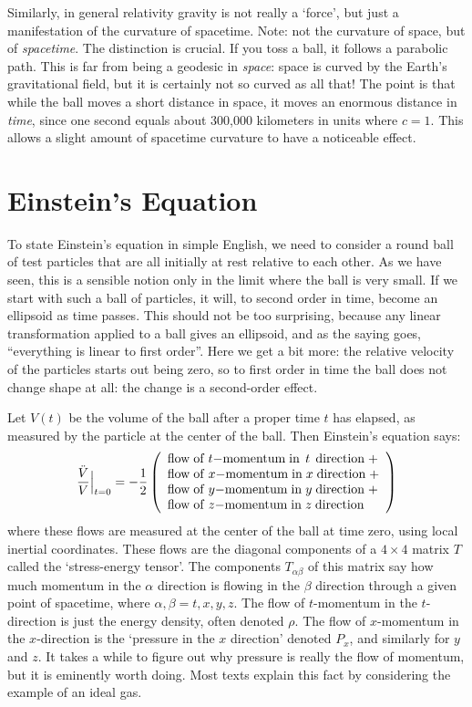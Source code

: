 Similarly, in general relativity gravity is not really a `force', but
just a manifestation of the curvature of spacetime.  Note: not the
curvature of space, but of {\it spacetime}.  The distinction is
crucial.  If you toss a ball, it follows a parabolic path.  This is far from
being a geodesic in {\it space}: space is curved by the Earth's
gravitational field, but it is certainly not so curved as all that!  The
point is that while the ball moves a short distance in space, it moves
an enormous distance in {\it time}, since one second equals about
300,000 kilometers in units where $c = 1$.  This allows a slight amount
of spacetime curvature to have a noticeable effect.

\section{Einstein's Equation}

To state Einstein's equation in simple English, we need to consider a
round ball of test particles that are all initially at
rest relative to each other.  As we have seen, this is a sensible
notion only in the limit where the ball is very small. If we start with
such a ball of particles, it will, to second order in
time, become an ellipsoid as time passes.  This should not be too
surprising, because any linear transformation applied to a ball gives an
ellipsoid, and as the saying goes, ``everything is linear to first
order''.  Here we get a bit more: the relative velocity of the particles
starts out being zero, so to first order in time the ball does not
change shape at all: the change is a second-order effect.

Let $V(t)$ be the volume of the ball after a proper time $t$ has
elapsed, as measured by the particle at the center of the ball.  Then
Einstein's equation says: 
\[ {\ddot V\over V} \Bigr|_{t = 0} =
 -{1\over 2} \left( \begin{array}{l} 
{\rm flow \; of \;} t{\rm -momentum \; in \;\,} t {\rm \,\; direction \;} + \\ 
{\rm flow \; of \;} x{\rm -momentum \; in \;} x {\rm \; direction \;} + \\ 
{\rm flow \; of \;} y{\rm -momentum \; in \;} y {\rm \; direction \;} + \\ 
{\rm flow \; of \;} z{\rm -momentum \; in \;} z {\rm \; direction} 
\end{array} \right) \] 
where these flows are measured at the center of the ball at time zero,
using local inertial coordinates.  These flows are the diagonal
components of a $4 \times 4$ matrix $T$ called the `stress-energy
tensor'.  The components $T_{\alpha \beta}$ of this matrix say how much
momentum in the $\alpha$ direction is flowing in the $\beta$ direction
through a given point of spacetime, where $\alpha,\beta = t,x,y,z$.  The
flow of $t$-momentum in the $t$-direction is just the energy density,
often denoted $\rho$.  The flow of $x$-momentum in the $x$-direction is
the `pressure in the $x$ direction' denoted $P_x$, and similarly for $y$
and $z$.  It takes a while to figure out why pressure is really the flow
of momentum, but it is eminently worth doing.  Most texts explain this
fact by considering the example of an ideal gas.

